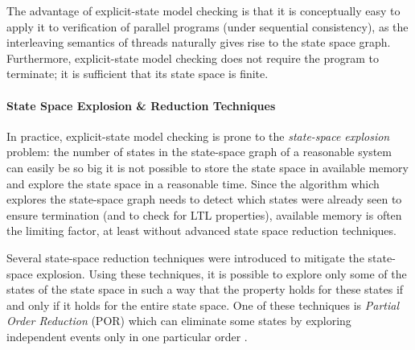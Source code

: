 The advantage of explicit-state model checking is that it is conceptually easy
to apply it to verification of parallel programs (under sequential
consistency), as the interleaving semantics of threads naturally gives rise to
the state space graph.
Furthermore, explicit-state model checking does not require the program to terminate; it is sufficient that its state space is finite.

\paragraph{State Space Explosion \& Reduction Techniques}

In practice, explicit-state model checking is prone to the \emph{state-space
explosion} problem: the number of states in the state-space graph of a
reasonable system can easily be so big it is not possible to store the state
space in available memory and explore the state space in a reasonable time.
Since the algorithm which explores the state-space graph needs to detect which
states were already seen to ensure termination (and to check for LTL
properties), available memory is often the limiting factor, at least without
advanced state space reduction techniques.


Several state-space reduction techniques were introduced to mitigate the state-space explosion.
Using these techniques, it is possible to explore only some of the states of
the state space in such a way that the property holds for these states if and
only if it holds for the entire state space.
One of these techniques is \emph{Partial Order Reduction} (POR) which
can eliminate some states by exploring independent events only in one
particular order .

